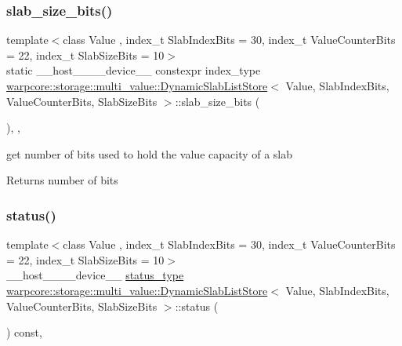 \subsubsection{\texorpdfstring{slab\+\_\+size\+\_\+bits()}{slab\_size\_bits()}}
{\footnotesize\ttfamily template$<$class Value , index\+\_\+t Slab\+Index\+Bits = 30, index\+\_\+t Value\+Counter\+Bits = 22, index\+\_\+t Slab\+Size\+Bits = 10$>$ \\
static \+\_\+\+\_\+host\+\_\+\+\_\+\+\_\+\+\_\+device\+\_\+\+\_\+ constexpr index\+\_\+type \hyperlink{classwarpcore_1_1storage_1_1multi__value_1_1DynamicSlabListStore}{warpcore\+::storage\+::multi\+\_\+value\+::\+Dynamic\+Slab\+List\+Store}$<$ Value, Slab\+Index\+Bits, Value\+Counter\+Bits, Slab\+Size\+Bits $>$\+::slab\+\_\+size\+\_\+bits (\begin{DoxyParamCaption}{ }\end{DoxyParamCaption})\hspace{0.3cm}{\ttfamily [inline]}, {\ttfamily [static]}, {\ttfamily [noexcept]}}



get number of bits used to hold the value capacity of a slab 

\begin{DoxyReturn}{Returns}
number of bits 
\end{DoxyReturn}
\mbox{\label{classwarpcore_1_1storage_1_1multi__value_1_1DynamicSlabListStore_a9f67ef2bd0b072938bce462656b2c8aa}} 
\subsubsection{\texorpdfstring{status()}{status()}}
{\footnotesize\ttfamily template$<$class Value , index\+\_\+t Slab\+Index\+Bits = 30, index\+\_\+t Value\+Counter\+Bits = 22, index\+\_\+t Slab\+Size\+Bits = 10$>$ \\
\+\_\+\+\_\+host\+\_\+\+\_\+\+\_\+\+\_\+device\+\_\+\+\_\+ \hyperlink{classwarpcore_1_1Status}{status\+\_\+type} \hyperlink{classwarpcore_1_1storage_1_1multi__value_1_1DynamicSlabListStore}{warpcore\+::storage\+::multi\+\_\+value\+::\+Dynamic\+Slab\+List\+Store}$<$ Value, Slab\+Index\+Bits, Value\+Counter\+Bits, Slab\+Size\+Bits $>$\+::status (\begin{DoxyParamCaption}{ }\end{DoxyParamCaption}) const\hspace{0.3cm}{\ttfamily [inline]}, {\ttfamily [noexcept]}}



